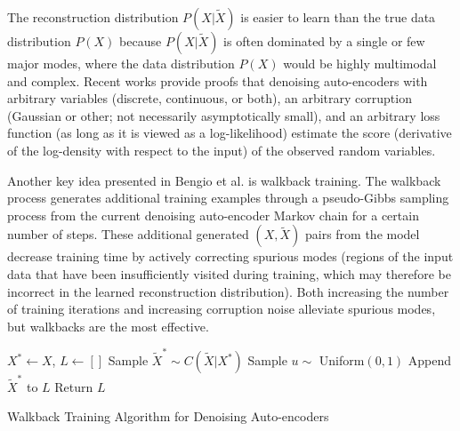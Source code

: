 The reconstruction distribution \(P(X|\widetilde{X})\) is easier to learn than the true data distribution \(P(X)\) because \(P(X|\widetilde{X})\) is often dominated by a single or few major modes, where the data distribution \(P(X)\) would be highly multimodal and complex. Recent works \cite{alain12, bengio13a} provide proofs that denoising auto-encoders with arbitrary variables (discrete, continuous, or both), an arbitrary corruption (Gaussian or other; not necessarily asymptotically small), and an arbitrary loss function (as long as it is viewed as a log-likelihood) estimate the score (derivative of the log-density with respect to the input) of the observed random variables.

Another key idea presented in Bengio et al. \cite{bengio13a} is walkback training. The walkback process generates additional training examples through a pseudo-Gibbs sampling process from the current denoising auto-encoder Markov chain for a certain number of steps. These additional generated \((X,\widetilde{X})\) pairs from the model decrease training time by actively correcting spurious modes (regions of the input data that have been insufficiently visited during training, which may therefore be incorrect in the learned reconstruction distribution). Both increasing the number of training iterations and increasing corruption noise alleviate spurious modes, but walkbacks are the most effective.
\begin{algorithm}[h!]
	\(X^* \leftarrow X\), \(L \leftarrow []\)\;
	Sample \(\widetilde{X}^* \sim C(\widetilde{X}|X^*)\)\;
	Sample \(u \sim\) Uniform\((0,1)\)\;
	Append \(\widetilde{X}^*\) to \(L\)\;
	Return \(L\)\;
	\caption{ Walkback Training Algorithm for Denoising Auto-encoders }
\end{algorithm}




